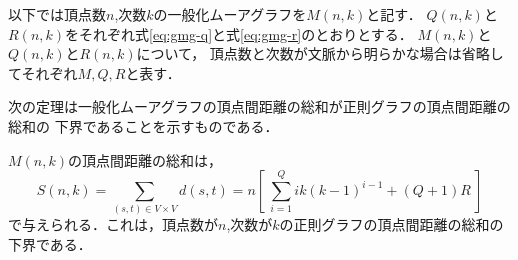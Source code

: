 以下では頂点数$n$,次数$k$の一般化ムーアグラフを$M(n,k)$と記す．
$Q(n,k)$と$R(n,k)$をそれぞれ式\eqref{eq:gmg-q}と式\eqref{eq:gmg-r}のとおりとする．
$M(n,k)$と$Q(n,k)$と$R(n,k)$について，
頂点数と次数が文脈から明らかな場合は省略してそれぞれ$M,Q,R$と表す．

次の定理は一般化ムーアグラフの頂点間距離の総和が正則グラフの頂点間距離の総和の
下界であることを示すものである．
\begin{theorem}\rm
  \label{thm:gmg-lower-bound}
  $M(n,k)$の頂点間距離の総和は，
  \begin{equation}
    \label{eq:gmg-lb}
    S(n,k) = \sum_{(s,t)\in V\times V}d(s,t) =
    n \left[\ \sum^{Q}_{i=1}ik(k-1)^{i-1} + (Q+1)R\ \right]
  \end{equation}
  で与えられる．これは，頂点数が$n$,次数が$k$の正則グラフの頂点間距離の総和の下界である．
\end{theorem}
